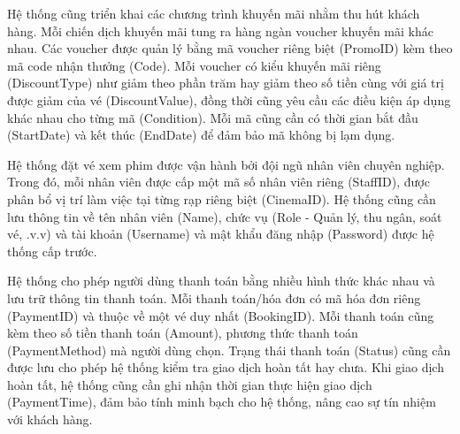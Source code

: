\documentclass[a4paper]{article}
\begin{document}
Hệ thống cũng triển khai các chương trình khuyến mãi nhằm thu hút khách hàng. Mỗi chiến dịch khuyến mãi tung ra hàng ngàn voucher khuyến mãi khác nhau. Các voucher được quản lý bằng mã voucher riêng biệt (PromoID) kèm theo mã code nhận thưởng (Code). Mỗi voucher có kiểu khuyến mãi riêng (DiscountType) như giảm theo phần trăm 
hay giảm theo số tiền cùng với giá trị được giảm của vé (DiscountValue), đồng thời cũng yêu cầu các điều kiện áp dụng khác nhau cho từng mã (Condition). Mỗi mã cũng cần có thời gian bắt đầu (StartDate) và kết thúc (EndDate) để đảm bảo mã không bị lạm dụng.

Hệ thống đặt vé xem phim được vận hành bởi đội ngũ nhân viên chuyên nghiệp. Trong đó, mỗi nhân viên được cấp một mã số nhân viên riêng (StaffID), được phân bổ vị trí làm việc tại từng rạp riêng biệt (CinemaID). Hệ thống cũng cần lưu thông tin về tên nhân viên (Name), chức vụ (Role - Quản lý, thu ngân, soát vé, .v.v) và tài khoản (Username) và mật khẩu đăng nhập (Password) được hệ thống cấp trước.

Hệ thống cho phép người dùng thanh toán bằng nhiều hình thức khác nhau và lưu trữ thông tin thanh toán. Mỗi thanh toán/hóa đơn có mã hóa đơn riêng (PaymentID) và thuộc về một vé duy nhất (BookingID). Mỗi thanh toán cũng kèm theo số tiền thanh toán (Amount), phương thức thanh toán (PaymentMethod) mà người dùng chọn. Trạng thái thanh toán (Status) cũng cần được lưu cho phép hệ thống kiểm tra giao dịch hoàn tất hay chưa. 
Khi giao dịch hoàn tất, hệ thống cũng cần ghi nhận thời gian thực hiện giao dịch (PaymentTime), đảm bảo tính minh bạch cho hệ thống, nâng cao sự tín nhiệm với khách hàng.

\end{document}
